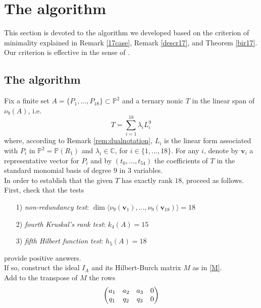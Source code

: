 \documentclass{amsart}
\newcommand{\C}{\mathbb{C}}
\newcommand{\Pj}{\mathbb{P}}
\newcommand{\vect}[1]{\mathbf{#1}}
\theoremstyle{definition}
\newcommand{\luca}[1]{{\color{orange}#1}}
\begin{document}
\section{The algorithm}\label{sec:alg}

This section is devoted to the algorithm we developed based on the criterion  of  minimality explained in Remark \ref{17case}, Remark \ref{descr17}, 
and Theorem \ref{bir17}. 
Our criterion is effective in the sense of \cite{COttVan17b}.

\subsection{The algorithm} \label{algor} Fix a finite set $ A = \{P_{1}, \ldots, P_{18}\} \subset \Pj^{2} $ and a ternary nonic $T$ in the linear span of $ \nu_{9}(A) $, i.e. 
\[
 T = \sum_{i=1}^{18} \lambda_{i}L^{9}_{i} 
\]
where, according to Remark \ref{rem:dualnotation}, $ L_{i} $ is the linear form associated with  $ P_{i} $ in $\Pj^2= \Pj(R_1)$ 
and $ \lambda_{i} \in \C $, for $ i \in \{1, \ldots, 18\}$. 
For any $ i $, denote by $ \vect{v}_{i} $ a representative vector for $ P_{i} $ and by $ (t_{0}, \ldots, t_{54}) $ the coefficients of $ T $ in the standard monomial basis of degree $ 9 $ in $ 3 $ variables. \\ In order to establish that the given $ T $ has exactly rank $ 18 $, proceed as follows. \\ First, check that the tests
 \begin{enumerate}
  \item[1)] \emph{non-redundancy test}: $\dim \langle \nu_9(\vect{v}_1), \ldots, \nu_9(\vect{v}_{18}) \rangle = 18$
  \item[2)] \emph{fourth Kruskal's rank test}: $k_{4}(A) = 15 $
  \item[3)] \emph{fifth Hilbert function test}: $h_{5}(A) = 18 $
 \end{enumerate}
provide positive answers.\\%
If so, construct the ideal $ I_{A} $ and its Hilbert-Burch matrix $ M $ as in \eqref{M}. \\ Add to the transpose of $ M $
the rows
$$ \begin{pmatrix} a_{1} & a_{2} & a_{3} & 0 \cr
q_{1} & q_{2} & q_{3} & 0 \cr
\end{pmatrix} $$
\end{document}
